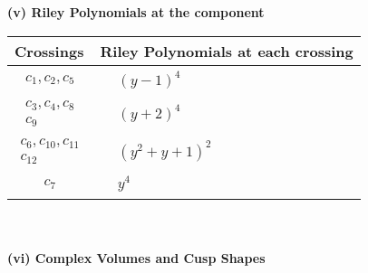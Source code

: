 \documentclass[1p]{elsarticle_modified}
\theoremstyle{definition}
\begin{document}
\newpage\renewcommand{\arraystretch}{1}
\flushleft \textbf{(v) Riley Polynomials at the component}\newline \\
\begin{tabular}{m{50pt}|m{274pt}}
Crossings & \hspace{64pt}Riley Polynomials at each crossing \\
\hline $$\begin{aligned}c_{1},c_{2},c_{5}\end{aligned}$$&$\begin{aligned}
&(y-1)^4
\end{aligned}$\\
\hline $$\begin{aligned}c_{3},c_{4},c_{8}\\c_{9}\end{aligned}$$&$\begin{aligned}
&(y+2)^4
\end{aligned}$\\
\hline $$\begin{aligned}c_{6},c_{10},c_{11}\\c_{12}\end{aligned}$$&$\begin{aligned}
&(y^2+y+1)^2
\end{aligned}$\\
\hline $$\begin{aligned}c_{7}\end{aligned}$$&$\begin{aligned}
&y^4
\end{aligned}$\\
\hline
\end{tabular}\\~\\
\newpage\flushleft \textbf{(vi) Complex Volumes and Cusp Shapes}
\end{document}
